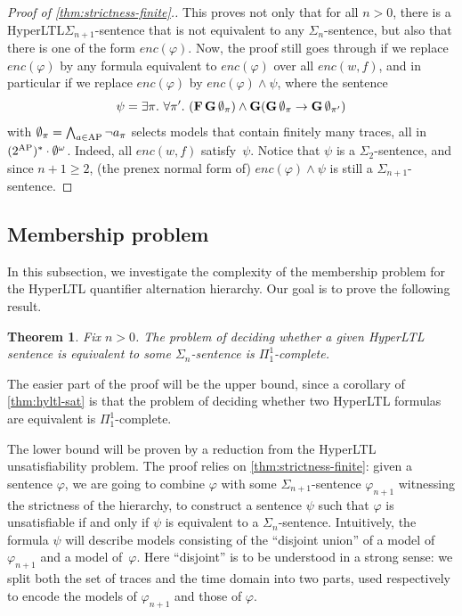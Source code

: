 \documentclass[dvipsnames,10pt,a4paper]{amsart}
\newtheorem{thm}{Theorem}[section]
\theoremstyle{definition}
\theoremstyle{remark}
\newcommand{\F}{\mathop{\mathbf{F}\vphantom{a}}\nolimits}
\newcommand{\G}{\mathop{\mathbf{G}\vphantom{a}}\nolimits}
\newcommand{\hyltl}{{HyperLTL}\xspace}
\newcommand\AP{\textup{AP}}
\newcommand\enc[2]{\mathit{enc}(#1,#2)}
\newcommand\encPhi[1]{\mathit{enc}(#1)}
\newcommand\Sign[1]{\Sigma_{#1}}
\begin{document}
\begin{proof}[Proof of \autoref{thm:strictness-finite}.]
  This proves not only that for all $n > 0$, there is a \hyltl $\Sigma_{n+1}$-sentence
  that is not equivalent to any $\Sigma_n$-sentence,
  but also that there is one of the form $\encPhi \varphi$.
  Now, the proof still goes through if we replace $\encPhi \varphi$ by
  any formula equivalent to $\encPhi \varphi$ over all $\enc{w}{f}$,
  and in particular if we replace $\encPhi \varphi$ by
  $\encPhi \varphi \land \psi$, where the sentence
  \[
    \psi = \exists \pi.\ \forall \pi'.\
    (\F \G \emptyset_\pi) \land
    \G( \G \emptyset_\pi \rightarrow  \G \emptyset_{\pi'})  \]
    with $
    \emptyset_\pi = \bigwedge_{a \in \AP} \lnot a_\pi$
  selects models that contain finitely many traces, all in
  $(2^\AP)^\ast \cdot \emptyset^\omega$.
  Indeed, all $\enc w f$ satisfy~$\psi$.
  Notice that $\psi$ is a $\Sigma_2$-sentence, and since $n+1 \ge 2$,
  (the prenex normal form of) $\encPhi \varphi \land \psi$ is still a $\Sign {n+1}$-sentence.
\end{proof}












\subsection{Membership problem}

In this subsection, we investigate the complexity of the membership problem for the \hyltl quantifier alternation hierarchy.
Our goal is to prove the following result.


\begin{thm}\label{thm:Pi11}
  Fix $n > 0$. The problem of deciding whether a given \hyltl sentence is equivalent
  to some $\Sigma_n$-sentence is $\Pi^1_1$-complete.
\end{thm}



The easier part of the proof will be the upper bound, since a corollary of
\autoref{thm:hyltl-sat} is that the problem of deciding whether two
\hyltl formulas are equivalent is $\Pi^1_1$-complete.

The lower bound will be proven by a reduction from the \hyltl unsatisfiability problem.
The proof relies on \autoref{thm:strictness-finite}: given a sentence
$\varphi$, we are going to combine $\varphi$ with some $\Sigma_{n+1}$-sentence
$\varphi_{n+1}$ witnessing the strictness of the hierarchy, to construct a sentence $\psi$
such that $\varphi$ is unsatisfiable if and only if $\psi$ is equivalent to
a $\Sigma_n$-sentence.
Intuitively, the formula $\psi$ will describe models consisting of the
``disjoint union'' of a model of $\varphi_{n+1}$ and a model of~$\varphi$.
Here ``disjoint'' is to be understood in a strong sense: we split both
the set of traces and the time domain into two parts, used respectively to
encode the models of $\varphi_{n+1}$ and those of $\varphi$.
\end{document}
